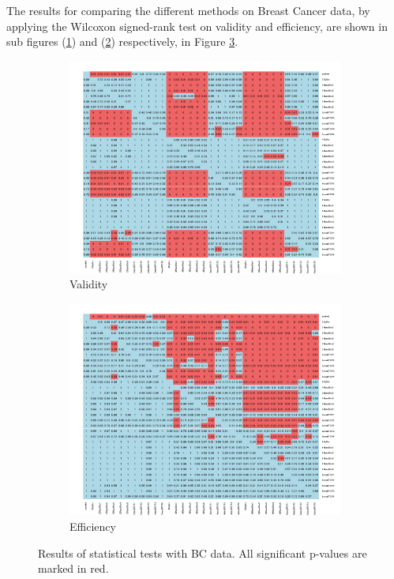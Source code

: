 \documentclass[main]{subfiles}
\begin{document}
The results for comparing the different methods on Breast Cancer data, by applying the Wilcoxon signed-rank test on validity and efficiency, are shown in sub figures (\ref{fig:valBC}) and (\ref{fig:effBC}) respectively, in Figure \ref{fig:testBC}.
 \begin{figure}[!h]
\centering
\begin{subfigure}{.5\textwidth}
  \centering
  \includegraphics[width=\linewidth]{images/heatmapBC}
  \caption{Validity}
  \label{fig:valBC}
\end{subfigure}%
\begin{subfigure}{.5\textwidth}
  \centering
  \includegraphics[width=\linewidth]{images/heatmapBC_eff}
  \caption{Efficiency}
  \label{fig:effBC}
\end{subfigure}%
\caption{Results of statistical tests with BC data. All significant p-values are marked in red.} \label{fig:testBC}
\end{figure}
\end{document}
